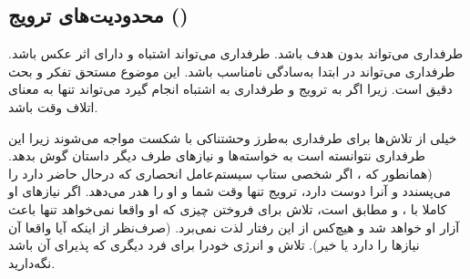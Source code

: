 \subsection{محدودیت‌های ترویج ()}

طرفداری می‌تواند بدون هدف باشد. طرفداری می‌تواند اشتباه و دارای اثر عکس باشد.
طرفداری می‌تواند در ابتدا به‌سادگی نامناسب باشد. این موضوع مستحق تفکر و بحث دقیق است.
زیرا اگر به ترویج و طرفداری به اشتباه انجام گیرد می‌تواند تنها به معنای اتلاف وقت باشد.

خیلی از تلاش‌ها برای طرفداری به‌طرز وحشتناکی با شکست مواجه می‌شوند
زیرا این طرفداری نتوانسته است به خواسته‌ها و نیاز‌های طرف دیگر داستان
گوش بدهد. (همانطور که 
،
اگر شخصی ستاپ سیستم‌عامل انحصاری که درحال حاضر دارد را می‌پسندد
و آنرا دوست دارد، ترویج تنها وقت شما و او را هدر می‌دهد.
اگر نیازهای او کاملا با ،  و
مطابق است، تلاش برای فروختن چیزی که او واقعا نمی‌خواهد 
تنها باعث آزار او خواهد شد و هیچ‌کس از این رفتار لذت نمی‌برد.
(صرف‌نظر از اینکه آیا واقعا آن نیازها را دارد یا خیر).
تلاش و انرژی خودرا برای فرد دیگری که پذیرای آن باشد نگه‌‌دارید.

